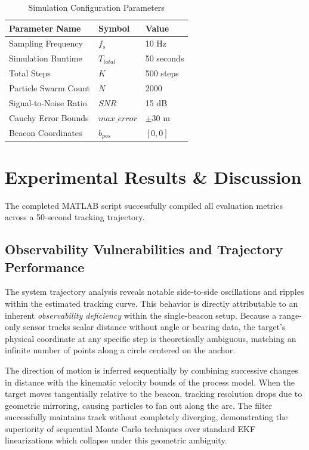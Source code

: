 \documentclass[10pt,twocolumn,a4paper]{article}
\begin{document}
\begin{table}[htbp]
\caption{Simulation Configuration Parameters}
\begin{center}
\begin{tabular}{lll}
\hline
\textbf{Parameter Name} & \textbf{Symbol} & \textbf{Value} \\
\hline
Sampling Frequency & $f_s$ & 10 Hz \\
Simulation Runtime & $T_{total}$ & 50 seconds \\
Total Steps & $K$ & 500 steps \\
Particle Swarm Count & $N$ & 2000 \\
Signal-to-Noise Ratio & $SNR$ & 15 dB \\
Cauchy Error Bounds & $max\_error$ & $\pm 30$ m \\
Beacon Coordinates & $b_{pos}$ & $[0, 0]$ \\
\hline
\end{tabular}
\label{tab:params}
\end{center}
\end{table}

\section{Experimental Results \& Discussion}
The completed MATLAB script successfully compiled all evaluation metrics across a 50-second tracking trajectory.

\subsection{Observability Vulnerabilities and Trajectory Performance}
The system trajectory analysis reveals notable side-to-side oscillations and ripples within the estimated tracking curve. This behavior is directly attributable to an inherent \textit{observability deficiency} within the single-beacon setup. Because a range-only sensor tracks scalar distance without angle or bearing data, the target's physical coordinate at any specific step is theoretically ambiguous, matching an infinite number of points along a circle centered on the anchor.

The direction of motion is inferred sequentially by combining successive changes in distance with the kinematic velocity bounds of the process model. When the target moves tangentially relative to the beacon, tracking resolution drops due to geometric mirroring, causing particles to fan out along the arc. The filter successfully maintains track without completely diverging, demonstrating the superiority of sequential Monte Carlo techniques over standard EKF linearizations which collapse under this geometric ambiguity.
\end{document}
